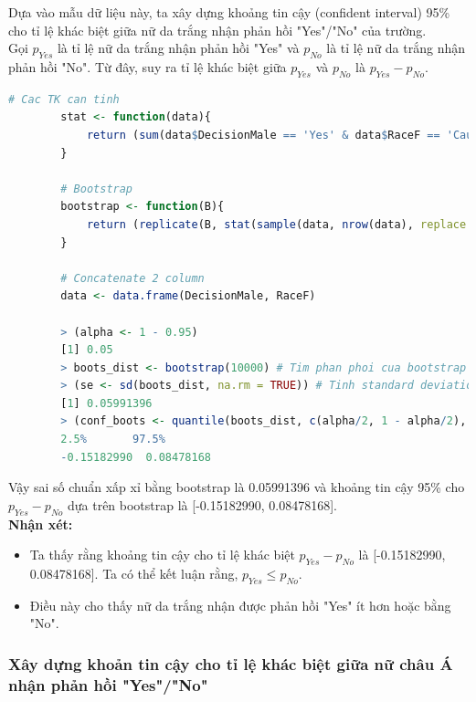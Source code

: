 \documentclass[a4paper,12pt]{article}
\begin{document}
		Dựa vào mẫu dữ liệu này, ta xây dựng khoảng tin cậy (confident interval) 95\% cho tỉ lệ khác biệt giữa nữ da trắng nhận phản hồi "Yes"/"No" của trường.\\
		
		Gọi $p_{Yes}$ là tỉ lệ nữ da trắng nhận phản hồi "Yes" và $p_{No}$ là tỉ lệ nữ da trắng nhận phản hồi "No". Từ đây, suy ra tỉ lệ khác biệt giữa $p_{Yes}$ và $p_{No}$ là $p_{Yes} - p_{No}$.
		
		\begin{lstlisting}[language=R]
		# Cac TK can tinh
		stat <- function(data){
			return (sum(data$DecisionMale == 'Yes' & data$RaceF == 'Caucasian')/ sum(data$DecisionMale == 'Yes') - sum(data$DecisionMale == 'No' & data$RaceF == 'Caucasian')/ sum(data$DecisionMale == 'No'))
		}
		
		# Bootstrap
		bootstrap <- function(B){
			return (replicate(B, stat(sample(data, nrow(data), replace = TRUE))))
		}
		
		# Concatenate 2 column
		data <- data.frame(DecisionMale, RaceF)
		
		> (alpha <- 1 - 0.95)
		[1] 0.05
		> boots_dist <- bootstrap(10000) # Tim phan phoi cua bootstrap
		> (se <- sd(boots_dist, na.rm = TRUE)) # Tinh standard deviation (missing value se bi bo qua)
		[1] 0.05991396
		> (conf_boots <- quantile(boots_dist, c(alpha/2, 1 - alpha/2), na.rm = TRUE)) # Tim khoang tin cay cho p
		2.5%       97.5% 
		-0.15182990  0.08478168 
		\end{lstlisting}
		Vậy sai số chuẩn xấp xỉ bằng bootstrap là 0.05991396 và khoảng tin cậy 95\% cho $p_{Yes} - p_{No}$ dựa trên bootstrap là [-0.15182990, 0.08478168].\\
		
		\textbf{Nhận xét:}
		\begin{itemize}
			\item Ta thấy rằng khoảng tin cậy cho tỉ lệ khác biệt $p_{Yes} - p_{No}$ là [-0.15182990, 0.08478168]. Ta có thể kết luận rằng, $p_{Yes} \leq p_{No}$.
			\item Điều này cho thấy nữ da trắng nhận được phản hồi "Yes" ít hơn hoặc bằng "No".
		\end{itemize}
		
		\subsubsection{Xây dựng khoản tin cậy cho tỉ lệ khác biệt giữa nữ châu Á nhận phản hồi "Yes"/"No"}
		
\end{document}
